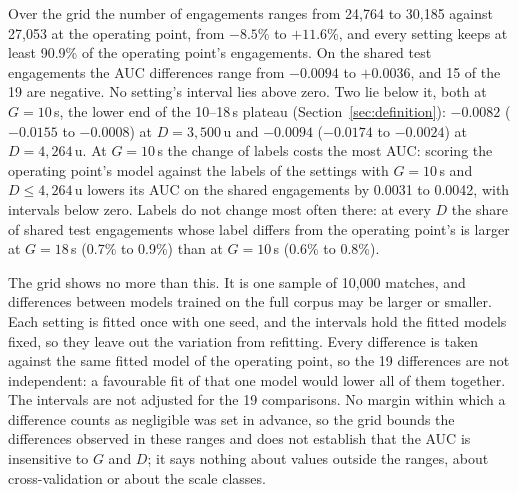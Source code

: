 Over the grid the number of engagements ranges from 24,764 to 30,185 against 27,053 at the operating point,
from $-8.5$\% to $+11.6$\%, and every setting keeps at least 90.9\% of the operating point's engagements.
On the shared test engagements the AUC differences range from $-0.0094$ to $+0.0036$, and 15 of the 19 are
negative. No setting's interval lies above zero. Two lie below it, both at $G = 10$\,s, the lower end of
the 10--18\,s plateau (Section~\ref{sec:definition}): $-0.0082$ ($-0.0155$ to $-0.0008$) at $D = 3{,}500$\,u and
$-0.0094$ ($-0.0174$ to $-0.0024$) at $D = 4{,}264$\,u. At $G = 10$\,s the change of labels costs the most
AUC: scoring the operating point's model against the labels of the settings with $G = 10$\,s and
$D \le 4{,}264$\,u lowers its AUC on the shared engagements by 0.0031 to 0.0042, with intervals below zero.
Labels do not change most often there: at every $D$ the share of shared test engagements whose label
differs from the operating point's is larger at $G = 18$\,s (0.7\% to 0.9\%) than at $G = 10$\,s (0.6\% to
0.8\%).

The grid shows no more than this. It is one sample of 10,000 matches, and differences between models
trained on the full corpus may be larger or smaller. Each setting is fitted once with one seed, and the
intervals hold the fitted models fixed, so they leave out the variation from refitting. Every difference is
taken against the same fitted model of the operating point, so the 19 differences are not independent: a
favourable fit of that one model would lower all of them together. The intervals are not adjusted for the
19 comparisons. No margin within which a difference counts as negligible was set in advance, so the grid
bounds the differences observed in these ranges and does not establish that the AUC is insensitive to $G$
and $D$; it says nothing about values outside the ranges, about cross-validation or about the scale
classes.

